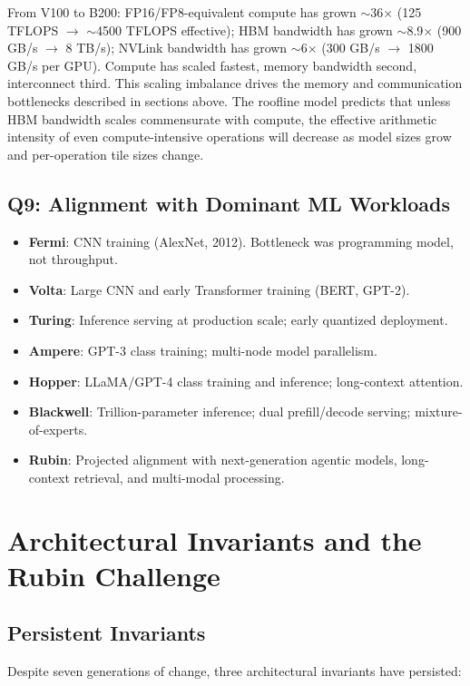 \documentclass[10pt,twocolumn]{article}
\begin{document}
From V100 to B200: FP16/FP8-equivalent compute has grown $\sim$36$\times$ (125 TFLOPS $\to$ $\sim$4500 TFLOPS effective); HBM bandwidth has grown $\sim$8.9$\times$ (900 GB/s $\to$ 8 TB/s); NVLink bandwidth has grown $\sim$6$\times$ (300 GB/s $\to$ 1800 GB/s per GPU). Compute has scaled fastest, memory bandwidth second, interconnect third. This scaling imbalance drives the memory and communication bottlenecks described in sections above. The roofline model predicts that unless HBM bandwidth scales commensurate with compute, the effective arithmetic intensity of even compute-intensive operations will decrease as model sizes grow and per-operation tile sizes change.

\subsection{Q9: Alignment with Dominant ML Workloads}

\begin{itemize}
\item \textbf{Fermi}: CNN training (AlexNet, 2012). Bottleneck was programming model, not throughput.
\item \textbf{Volta}: Large CNN and early Transformer training (BERT, GPT-2).
\item \textbf{Turing}: Inference serving at production scale; early quantized deployment.
\item \textbf{Ampere}: GPT-3 class training; multi-node model parallelism.
\item \textbf{Hopper}: LLaMA/GPT-4 class training and inference; long-context attention.
\item \textbf{Blackwell}: Trillion-parameter inference; dual prefill/decode serving; mixture-of-experts.
\item \textbf{Rubin}: Projected alignment with next-generation agentic models, long-context retrieval, and multi-modal processing.
\end{itemize}

\section{Architectural Invariants and the Rubin Challenge}
\label{sec:invariants}

\subsection{Persistent Invariants}

Despite seven generations of change, three architectural invariants have persisted:
\end{document}
